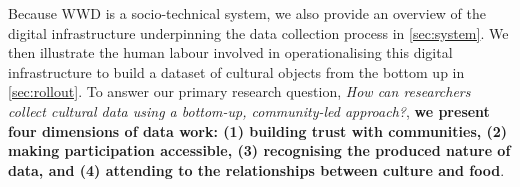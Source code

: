 Because \textsc{WWD} is a socio-technical system, we also provide an overview of the digital infrastructure underpinning the data collection process in \cref{sec:system}. We then illustrate the human labour involved in operationalising this digital infrastructure to build a dataset of cultural objects from the bottom up in \cref{sec:rollout}. To answer our primary research question, \textit{How can researchers collect cultural data using a bottom-up, community-led approach?}, \textbf{we present four dimensions of data work: (1) building trust with communities, (2) making participation accessible, (3) recognising the produced nature of data, and (4) attending to the relationships between culture and food}.
